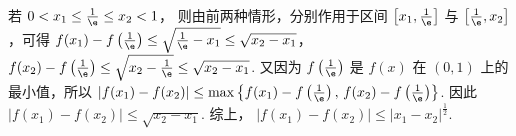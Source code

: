 \begin{solution}
\begin{enumerate}
若
\(0<x_1\le \frac1\e\le x_2<1\)，
则由前两种情形，分别作用于区间 \(\left[x_1,\frac1\e\right]\) 与 \(\left[\frac1\e,x_2\right]\)，可得
\(f(x_1)-f\left(\frac1\e\right)\le \sqrt{\frac1\e-x_1}\le \sqrt{x_2-x_1}\)，
\(f(x_2)-f\left(\frac1\e\right)\le \sqrt{x_2-\frac1\e}\le \sqrt{x_2-x_1}\).
又因为 \(f\left(\frac1\e\right)\) 是 \(f(x)\) 在 \((0,1)\) 上的最小值，所以
\(|f(x_1)-f(x_2)| \le \max\left\{f(x_1)-f\left(\frac1\e\right),\,f(x_2)-f\left(\frac1\e\right)\right\}\).
因此
\(|f(x_1)-f(x_2)|\le \sqrt{x_2-x_1}\).
综上，
\(|f(x_1)-f(x_2)|\le |x_1-x_2|^{\frac{1}{2}}\).
\end{enumerate}
\end{solution}
